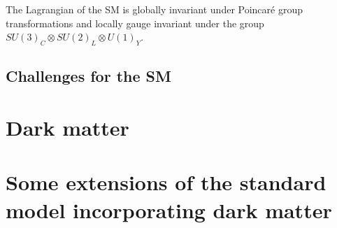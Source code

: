 The Lagrangian of the SM is globally invariant under Poincar\'e group transformations and locally gauge invariant under the group $SU\left(3\right)_{C}\otimes SU\left(2\right)_{L}\otimes U\left(1\right)_{Y}$. 




\subsection{Challenges for the SM}
\label{sec:SMchallenges}


\section{Dark matter}
\label{sec:DM}

\section{Some extensions of the standard model incorporating dark matter}
\label{sec:DMextensions}
